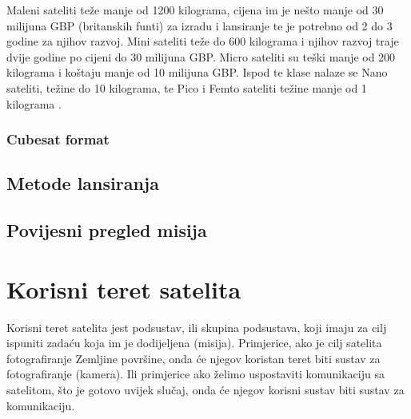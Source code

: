 \documentclass[times, utf8, diplomski, numeric]{templates/template}
\begin{document}
{{{            Maleni sateliti  teže manje od 1200 kilograma, cijena im je nešto manje od 30 milijuna GBP (britanskih funti) za izradu i lansiranje te je potrebno od 2 do 3 godine za njihov razvoj. Mini sateliti teže do 600 kilograma i njihov razvoj traje dvije godine po cijeni do 30 milijuna GBP. Micro sateliti su teški manje od 200 kilograma i koštaju manje od 10 milijuna GBP. Ispod te klase nalaze se Nano sateliti, težine do 10 kilograma, te Pico i Femto sateliti težine manje od 1 kilograma \cite{hrvatskiVojnik}.

            \subsubsection{Cubesat format}{
            }
        }
        
        \subsection{Metode lansiranja}{
        }
        
        \subsection{Povijesni pregled misija}{
        }
    }

    \section{Korisni teret satelita}{
        Korisni teret satelita  jest podsustav, ili skupina podsustava, koji imaju za cilj ispuniti zadaću koja im je dodijeljena (misija). Primjerice, ako je cilj satelita fotografiranje Zemljine površine, onda će njegov koristan teret biti sustav za fotografiranje (kamera). Ili primjerice ako želimo uspostaviti komunikaciju sa satelitom, što je gotovo uvijek slučaj, onda će njegov korisni sustav biti sustav za komunikaciju.

}}
\end{document}
